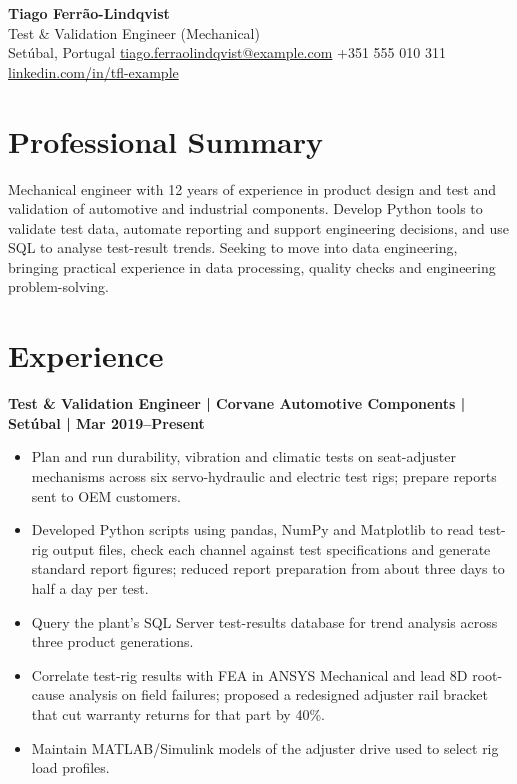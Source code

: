 \documentclass[11pt,a4paper]{article}
\begin{document}
\begin{center}
    {\Huge\bfseries\color{primarycolor} Tiago Ferrão-Lindqvist}\\[0.35em]
    {\large\color{accentcolor} Test \& Validation Engineer (Mechanical)}\\[0.3em]
    Setúbal, Portugal \textbar{} \href{mailto:tiago.ferraolindqvist@example.com}{tiago.ferraolindqvist@example.com} \textbar{} +351 555 010 311 \textbar{} \href{https://linkedin.com/in/tfl-example}{linkedin.com/in/tfl-example}
\end{center}

\section*{Professional Summary}
Mechanical engineer with 12 years of experience in product design and test and validation of automotive and industrial components. Develop Python tools to validate test data, automate reporting and support engineering decisions, and use SQL to analyse test-result trends. Seeking to move into data engineering, bringing practical experience in data processing, quality checks and engineering problem-solving.

\section*{Experience}

\noindent\textbf{Test \& Validation Engineer | Corvane Automotive Components | Setúbal | Mar 2019–Present}
\begin{itemize}
    \item Plan and run durability, vibration and climatic tests on seat-adjuster mechanisms across six servo-hydraulic and electric test rigs; prepare reports sent to OEM customers.
    \item Developed Python scripts using pandas, NumPy and Matplotlib to read test-rig output files, check each channel against test specifications and generate standard report figures; reduced report preparation from about three days to half a day per test.
    \item Query the plant’s SQL Server test-results database for trend analysis across three product generations.
    \item Correlate test-rig results with FEA in ANSYS Mechanical and lead 8D root-cause analysis on field failures; proposed a redesigned adjuster rail bracket that cut warranty returns for that part by 40\%.
    \item Maintain MATLAB/Simulink models of the adjuster drive used to select rig load profiles.
\end{itemize}
\end{document}
